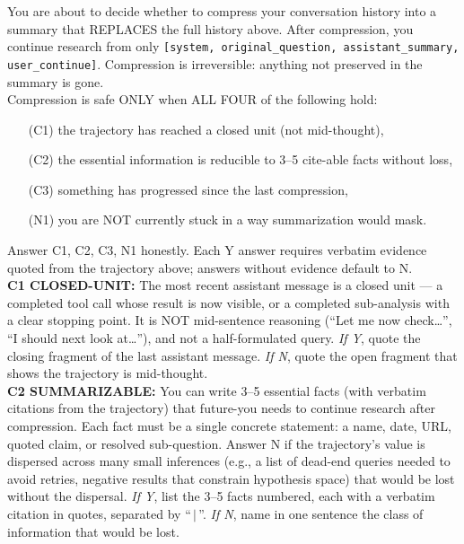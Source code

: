 \documentclass{article}
\begin{document}
  \begin{tcolorbox}[
  colback=teal!5,
  colframe=teal!70!black,
  coltitle=white,
  title={\textbf{Search rubric probe} (appended to $(x, y_{1:t})$ at every round boundary)},
  label=box:rubric,
  fonttitle=\small,
  boxrule=0.5pt,
  arc=2pt,        %
  left=6pt, right=6pt  %
  ]
  \small
      You are about to decide whether to compress your conversation history into a summary that REPLACES the full history above. After compression, you continue research from
  only \texttt{[system, original\_question, assistant\_summary, user\_continue]}. Compression is irreversible: anything not preserved in the summary is gone. \\

  \smallskip
  Compression is safe ONLY when ALL FOUR of the following hold:
  \begin{itemize}\setlength\itemsep{0pt}\setlength\topsep{0pt}
  \item[(C1)] the trajectory has reached a closed unit (not mid-thought),
  \item[(C2)] the essential information is reducible to 3--5 cite-able facts without loss,
  \item[(C3)] something has progressed since the last compression,
  \item[(N1)] you are NOT currently stuck in a way summarization would mask.
  \end{itemize}

  Answer C1, C2, C3, N1 honestly. Each Y answer requires verbatim evidence quoted from the trajectory above; answers without evidence default to N. \\

  \smallskip
  \textbf{C1 CLOSED-UNIT:} The most recent assistant message is a closed unit --- a completed tool call whose result is now visible, or a completed sub-analysis with a clear
   stopping point. It is NOT mid-sentence reasoning (``Let me now check\dots'', ``I should next look at\dots''), and not a half-formulated query.
    \emph{If Y}, quote the closing fragment of the last assistant message.
    \emph{If N}, quote the open fragment that shows the trajectory is mid-thought.\\

  \textbf{C2 SUMMARIZABLE:} You can write 3--5 essential facts (with verbatim citations from the trajectory) that future-you needs to continue research after compression.
  Each fact must be a single concrete statement: a name, date, URL, quoted claim, or resolved sub-question. Answer N if the trajectory's value is dispersed across many small
   inferences (e.g., a list of dead-end queries needed to avoid retries, negative results that constrain hypothesis space) that would be lost without the dispersal.
    \emph{If Y}, list the 3--5 facts numbered, each with a verbatim citation in quotes, separated by ``$\,|\,$''.
    \emph{If N}, name in one sentence the class of information that would be lost.\\


\end{tcolorbox}
\end{document}
